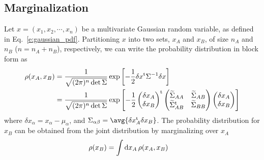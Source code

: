 \documentclass[nobib]{tufte-handout}
\begin{document}
\subsection{Marginalization}
Let $x = (x_1, x_2, \cdots, x_n)$ be a multivariate Gaussian random variable, as defined in Eq.~\eqref{e:gaussian_pdf}. Partitioning $x$ into two sets, $x_A$ and $x_B$, of size $n_A$ and $n_B$ ($n=n_A + n_B$), respectively, we can
write the probability distribution in block form as
\begin{align}
\rho(x_A, x_B) &= \frac{1}{\sqrt{(2\pi)^n \det\Sigma}} \exp{\left[-\frac{1}{2}\delta x^\textrm{t}
\Sigma^{-1}\delta x\right]}\notag \\
  &=\frac{1}{\sqrt{(2\pi)^n \det\Sigma}} \exp{\left[-\frac{1}{2}\begin{pmatrix}\delta x_A\\ \delta x_B\end{pmatrix}^\textrm{t}
  \begin{pmatrix}\widetilde{\Sigma}_{AA} & \widetilde{\Sigma}_{AB}\\ \widetilde{\Sigma}_{AB}^\textrm{t} & \widetilde{\Sigma}_{BB}\end{pmatrix}
  \begin{pmatrix}\delta x_A\\ \delta x_B\end{pmatrix}\right]}\notag 
\end{align}
where $\delta x_\alpha = x_\alpha - \mu_\alpha$, and $\Sigma_{\alpha\beta} = \avg{\transpose{\delta x_A} \delta x_B}$. The probability 
distribution for $x_B$ can be obtained from the joint distribution by marginalizing over $x_A$
\begin{align}
  \rho(x_B) &= \int\text{d} x_A\, \rho(x_A, x_B)
\end{align}
\end{document}
